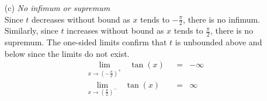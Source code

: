 \documentclass[12pt]{amsart}
\begin{document}
\begin{enumerate}
\begin{enumerate}
\begin{enumerate}
					\item[(c)] \emph{No infimum or supremum}\\
					Since $t$ decreases without bound as $x$ tends to $-\frac{\pi}{2}$, there is no
					infimum. Similarly, since $t$ increases without bound as $x$ tends to $\frac{\pi}{2}$,
					there is no supremum.  The one-sided limits confirm that $t$ is unbounded above 						and below since the limits do not exist.
					\begin{eqnarray}
						\lim_{x \rightarrow (-{\frac{\pi}{2}})^+} \text{ } \tan(x) \text{ } & = & -\infty 								\nonumber \\
						\lim_{x \rightarrow (\frac{\pi}{2})^-} \text{ } \tan(x) \text{ } & = &\infty \nonumber
					\end{eqnarray}
				\end{enumerate}
				
		\end{enumerate}

\end{enumerate}
	
\end{document}
